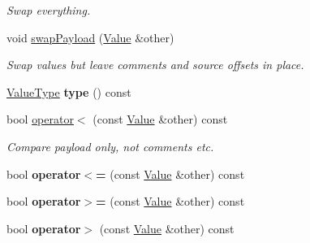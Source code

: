 \begin{DoxyCompactItemize}
\begin{DoxyCompactList}\small\item\em Swap everything. \end{DoxyCompactList}\item 
void \hyperlink{class_json_1_1_value_a5263476047f20e2fc6de470e4de34fe5}{swap\+Payload} (\hyperlink{class_json_1_1_value}{Value} \&other)\hypertarget{class_json_1_1_value_a5263476047f20e2fc6de470e4de34fe5}{}\label{class_json_1_1_value_a5263476047f20e2fc6de470e4de34fe5}

\begin{DoxyCompactList}\small\item\em Swap values but leave comments and source offsets in place. \end{DoxyCompactList}\item 
\hyperlink{namespace_json_a7d654b75c16a57007925868e38212b4e}{Value\+Type} {\bfseries type} () const \hypertarget{class_json_1_1_value_a695ef31fad36b4712918b3ff80158479}{}\label{class_json_1_1_value_a695ef31fad36b4712918b3ff80158479}

\item 
bool \hyperlink{class_json_1_1_value_af0ad8aa027575c3277296458f3fb7b0a}{operator$<$} (const \hyperlink{class_json_1_1_value}{Value} \&other) const \hypertarget{class_json_1_1_value_af0ad8aa027575c3277296458f3fb7b0a}{}\label{class_json_1_1_value_af0ad8aa027575c3277296458f3fb7b0a}

\begin{DoxyCompactList}\small\item\em Compare payload only, not comments etc. \end{DoxyCompactList}\item 
bool {\bfseries operator$<$=} (const \hyperlink{class_json_1_1_value}{Value} \&other) const \hypertarget{class_json_1_1_value_afb99dd3628fe44244b32007f9b4f369a}{}\label{class_json_1_1_value_afb99dd3628fe44244b32007f9b4f369a}

\item 
bool {\bfseries operator$>$=} (const \hyperlink{class_json_1_1_value}{Value} \&other) const \hypertarget{class_json_1_1_value_acc13fc47d55abd6e2327b090b83d2911}{}\label{class_json_1_1_value_acc13fc47d55abd6e2327b090b83d2911}

\item 
bool {\bfseries operator$>$} (const \hyperlink{class_json_1_1_value}{Value} \&other) const \hypertarget{class_json_1_1_value_a3124a26067bdfde9571bc89527fc6931}{}\label{class_json_1_1_value_a3124a26067bdfde9571bc89527fc6931}


\end{DoxyCompactItemize}

